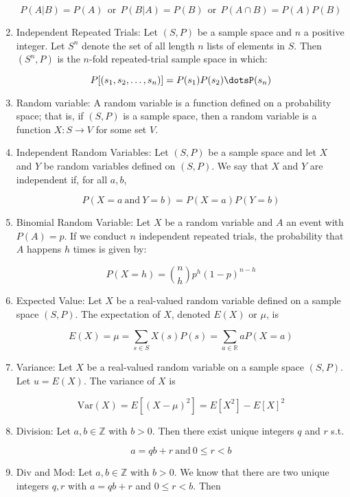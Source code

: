 \documentclass{article}
\begin{document}
\begin{enumerate}
    \[P(A|B)=P(A)\:\: \text{or} \:\: P(B|A)=P(B) \:\: \text{or} \:\: P(A\cap B)=P(A)P(B)\]

    \item Independent Repeated Trials: Let $(S,P)$ be a sample space and $n$ a positive integer.
    Let $S^n$ denote the set of all length $n$ lists of elements in $S$.
    Then $(S^n,P)$ is the $n$-fold repeated-trial sample space in which:

    \[P[(s_1,s_2,\dots,s_n)]=P(s_1)P(s_2)\dotsP(s_n)\]

    \item Random variable: A random variable is a function defined on a probability space;
    that is, if $(S,P)$ is a sample space, then a random variable is a function $X:S\to V$ for some set $V$.

    \item Independent Random Variables: Let $(S,P)$ be a sample space and let $X$ and $Y$ be random variables defined on $(S,P)$.
    We say that $X$ and $Y$ are independent if, for all $a,b$,

    \[P(X=a\: \text{and} \: Y=b)=P(X=a)P(Y=b)\]

    \item Binomial Random Variable: Let $X$ be a random variable and $A$ an event with $P(A)=p$.
    If we conduct $n$ independent repeated trials, the probability that $A$ happens $h$ times is given by:

     \[P(X=h)= {n \choose h} p^h(1-p)^{n-h}\]

    \item Expected Value: Let $X$ be a real-valued random variable defined on a sample space $(S,P)$.
    The expectation of $X$, denoted $E(X)$ or $\mu$, is

    \[E(X)=\mu=\sum_{s\in S}X(s)P(s)=\sum_{a\in\mathbb{R}}aP(X=a)\]

    \item Variance: Let $X$ be a real-valued random variable on a sample space $(S,P)$.
    Let $u=E(X)$.
    The variance of $X$ is

    \[\text{Var}(X)=E[(X-\mu)^2]=E[X^2]-E[X]^2\]

    \item Division: Let $a,b\in\mathbb{Z}$ with $b>0$.
    Then there exist unique integers $q$ and $r$ s.t.

    \[a=qb+r \: \text{and} \: 0\leq r<b\]

    \item Div and Mod: Let $a,b\in\mathbb{Z}$ with $b>0$.
    We know that there are two unique integers $q,r$ with $a=qb+r$ and $0\leq r<b$.
    Then


\end{enumerate}
\end{document}
